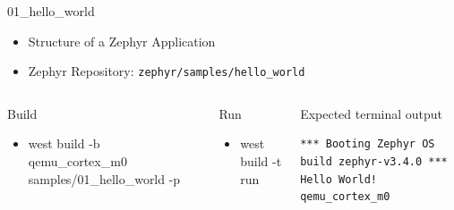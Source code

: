 \documentclass[10pt, aspectratio=169]{beamer}
\begin{document}
\begin{frame}[fragile]{01\_hello\_world}

  \begin{itemize}
     \item Structure of a Zephyr Application
     \item Zephyr Repository: \texttt{zephyr/samples/hello\_world}
  \end{itemize}

  \begin{columns}[T,onlytextwidth]
      \begin{block}{Build}
        \begin{itemize}
          \item {\scriptsize west build -b qemu\_cortex\_m0 samples/01\_hello\_world -p}
        \end{itemize}
      \end{block}

     \begin{block}{Run}
        \begin{itemize}
          \item {\scriptsize west build -t run}
        \end{itemize}
      \end{block}



      \begin{exampleblock}{Expected terminal output}

        {\fontsize{7}{9.6}\selectfont
          \begin{verbatim}
*** Booting Zephyr OS build zephyr-v3.4.0 ***
Hello World! qemu_cortex_m0
          \end{verbatim}
        }
      \end{exampleblock}

  \end{columns}

\end{frame}
\end{document}
